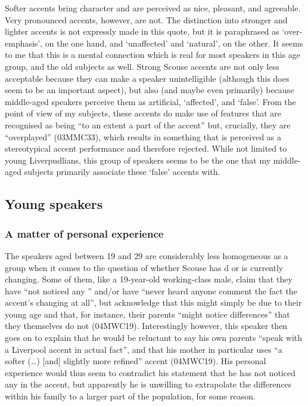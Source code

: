 Softer accents bring character and are perceived as nice, pleasant, and agreeable.
Very pronounced accents, however, are not.
The distinction into stronger and lighter accents is not expressly made in this quote, but it is paraphrased as `over-emphasis', on the one hand, and `unaffected' and `natural', on the other.
It seems to me that this is a mental connection which is real for most speakers in this age group, and the old subjects as well.
Strong Scouse accents are not only less acceptable because they can make a speaker unintelligible (although this does seem to be an important aspect), but also (and maybe even primarily) because middle-aged speakers perceive them as artificial, `affected', and `false'.
From the point of view of my subjects, these accents do make use of features that are recognised as being ``to an extent a part of the accent'' but, crucially, they  are ``overplayed'' (03MMC33), which results in something that is perceived as a stereotypical accent performance and therefore rejected.
While not limited to young Liverpudlians, this group of speakers seems to be the one that my middle-aged subjects primarily associate these `false' accents with.

\subsection{Young speakers}

\subsubsection{A matter of personal experience}
\label{aware_res.eval.young.change}

The speakers aged between 19 and 29 are considerably less homogeneous as a group when it comes to the question of whether Scouse has d or is currently changing.
Some of them, like a 19-year-old working-class male, claim that they have ``not noticed any '' and/or have ``never heard anyone comment the fact the accent's changing at all'', but acknowledge that this might simply be due to their young age and that, for instance, their parents ``might notice differences'' that they themselves do not (04MWC19).
Interestingly however, this speaker then goes on to explain that he would be reluctant to say his own parents ``speak with a Liverpool accent in actual fact'', and that his mother in particular uses ``a softer (\ldots) [and] slightly more refined'' accent (04MWC19).
His personal experience would thus seem to contradict his statement that he has not noticed any  in the accent, but apparently he is unwilling to extrapolate the differences within his family to a larger part of the population, for some reason.

